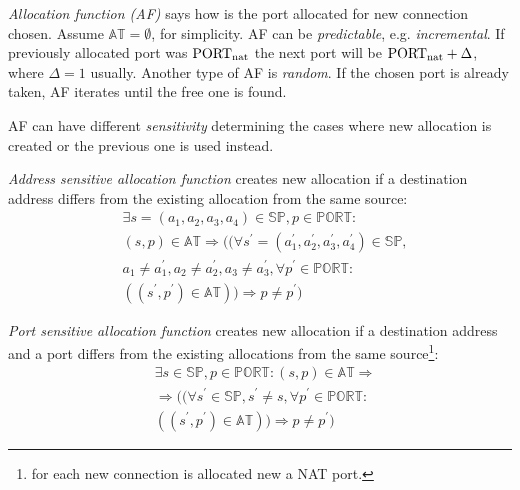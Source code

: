 \documentclass[twoside]{article}
\begin{document}
\begin{multicols}{2}
\emph{Allocation function (AF)} says how is the port allocated for new connection chosen. Assume $\mathbb{AT}=\emptyset$, for simplicity. 
AF can be \emph{predictable}, e.g. \emph{incremental}. If previously allocated port was $\text{PORT\textsubscript{nat}}$
the next port will be $\text{PORT\textsubscript{nat}}+\Delta$, where $\Delta=1$ usually. Another type of AF is \emph{random}.
If the chosen port is already taken, AF iterates until the free one is found.

AF can have different \emph{sensitivity} determining the cases where new allocation is created or the previous one is used instead.

\emph{Address sensitive allocation function} creates new allocation if a destination address differs from the existing allocation 
from the same source:
\begin{align*}
& \exists s=(a_1,a_2,a_3,a_4) \in \mathbb{SP}, p \in \mathbb{PORT}: \\
& (s, p) \in \mathbb{AT} \Rightarrow ((\forall s^{\prime}=(a_1^{\prime},a_2^{\prime},a_3^{\prime},a_4^{\prime}) \in \mathbb{SP}, \\
& a_1 \neq a_1^{\prime}, a_2 \neq a_2^{\prime}, a_3 \neq a_3^{\prime}, \forall p^{\prime} \in \mathbb{PORT}: \\
& ((s^{\prime}, p^{\prime}) \in \mathbb{AT})) \Rightarrow p \neq p^{\prime})
\end{align*}

\emph{Port sensitive allocation function} creates new allocation if a destination address and a port differs from the existing
allocations from the same source\footnote{for each new connection is allocated new a NAT port.}:
\begin{align*}
& \exists s \in \mathbb{SP}, p \in \mathbb{PORT}: (s, p) \in \mathbb{AT} \Rightarrow \\
& \Rightarrow ((\forall s^{\prime} \in \mathbb{SP}, s^{\prime} \neq s , \forall p^{\prime} \in \mathbb{PORT}: \\
& ((s^{\prime}, p^{\prime}) \in \mathbb{AT})) \Rightarrow p \neq p^{\prime})
\end{align*}

% 


\end{multicols}
\end{document}
